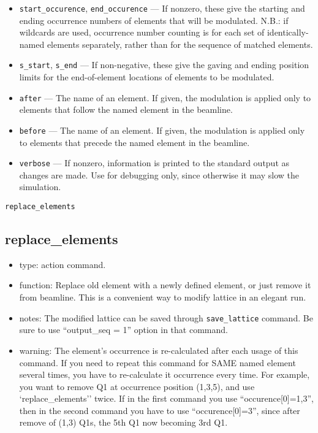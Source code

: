 \documentclass[11pt]{article}
\begin{document}
\begin{itemize}
\begin{itemize}
  \end{itemize}
\item \verb|start_occurence|, \verb|end_occurence| --- If nonzero, these give the starting and
 ending occurrence numbers of elements that will be modulated. N.B.: if wildcards are used, occurrence
 number counting is for each set of identically-named elements separately, rather than for the sequence
 of matched elements.
\item \verb|s_start|, \verb|s_end| --- If non-negative, these give the gaving and ending position
 limits for the end-of-element locations of elements to be modulated.
\item \verb|after| --- The name of an element.  If given, the modulation is applied only to elements
 that follow the named element in the beamline.  
\item \verb|before| --- The name of an element.  If given, the modulation is applied only to elements
 that precede the named element in the beamline. 
\item \verb|verbose| --- If nonzero, information is printed to the standard output as changes are
        made.  Use for debugging only, since otherwise it may slow the simulation.
\end{itemize}

\begin{latexonly}
\newpage
\begin{center}{\Large\verb|replace_elements|}\end{center}
\end{latexonly}
\subsection{replace\_elements \label{subsec:replaceelements}}

\begin{itemize}
\item type: action command.
\item function: Replace old element with a newly defined element, or just 
   remove it from beamline. This is a convenient way to modify lattice in an elegant run.
\item notes: 
	The modified lattice can be saved through \verb|save_lattice|
   command. Be sure to use ``output\_seq = 1'' option in that command.  
\item warning:
   The element's occurrence is re-calculated after each usage of this command. If 
   you need to repeat this command for SAME named element several times, you have to re-calculate 
   it occurrence every time. For example, you want to remove Q1 at occurrence position 
   (1,3,5), and use 
   `replace\_elements'' twice. If in the first command you use ``occurence[0]=1,3'',
   then in the second command you have to use ``occurence[0]=3'', since after remove of
   (1,3) Q1s, the 5th Q1 now becoming 3rd Q1.
\end{itemize}
\end{document}

